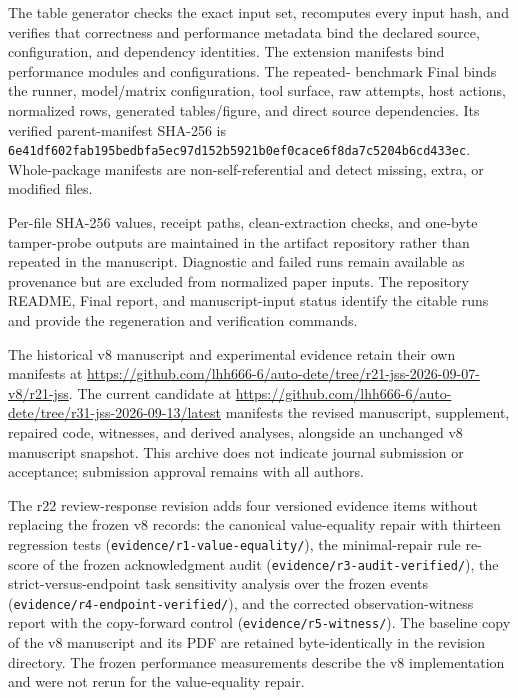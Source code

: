 \documentclass[preprint,12pt,authoryear]{elsarticle}
\newcommand{\code}[1]{\nolinkurl{#1}}
\begin{document}
The table generator checks the exact input set, recomputes every input hash, and verifies that
correctness and performance metadata bind the declared source, configuration, and dependency
identities. The extension manifests bind performance modules and configurations. The repeated-
benchmark Final binds the runner, model/matrix configuration, tool surface, raw attempts, host
actions, normalized rows, generated tables/figure, and direct source dependencies. Its verified
parent-manifest SHA-256 is
\code{6e41df602fab195bedbfa5ec97d152b5921b0ef0cace6f8da7c5204b6cd433ec}.
Whole-package manifests are non-self-referential and detect missing, extra, or modified files.

Per-file SHA-256 values, receipt paths, clean-extraction checks, and one-byte tamper-probe outputs
are maintained in the artifact repository rather than repeated in the manuscript. Diagnostic and
failed runs remain available as provenance but are excluded from normalized paper inputs. The
repository README, Final report, and manuscript-input status identify the citable runs and provide
the regeneration and verification commands.

The historical v8 manuscript and experimental evidence retain their own manifests at \url{https://github.com/lhh666-6/auto-dete/tree/r21-jss-2026-09-07-v8/r21-jss}. The current candidate at \url{https://github.com/lhh666-6/auto-dete/tree/r31-jss-2026-09-13/latest} manifests the revised manuscript, supplement, repaired code, witnesses, and derived analyses, alongside an unchanged v8 manuscript snapshot. This archive does not indicate journal submission or acceptance; submission approval remains with all authors.

The r22 review-response revision adds four versioned evidence items without replacing the frozen v8 records: the canonical value-equality repair with thirteen regression tests (\code{evidence/r1-value-equality/}), the minimal-repair rule re-score of the frozen acknowledgment audit (\code{evidence/r3-audit-verified/}), the strict-versus-endpoint task sensitivity analysis over the frozen events (\code{evidence/r4-endpoint-verified/}), and the corrected observation-witness report with the copy-forward control (\code{evidence/r5-witness/}). The baseline copy of the v8 manuscript and its PDF are retained byte-identically in the revision directory. The frozen performance measurements describe the v8 implementation and were not rerun for the value-equality repair.
\end{document}
